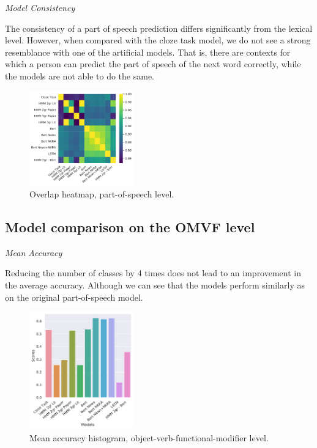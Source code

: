 \documentclass[a4paper]{article}
\newcommand{\head}[1]{\vspace{0.5em}\emph{#1}\vspace{0.25em}}
\begin{document}
\head{Model Consistency}

The consistency of a part of speech prediction differs significantly from the lexical level. However, when compared with the cloze task model, we do not see a strong resemblance with one of the artificial models. That is, there are contexts for which a person can predict the part of speech of the next word correctly, while the models are not able to do the same.

\begin{figure}
\label{fig:heatmap-context-accord-pos}
\caption{Overlap heatmap, part-of-speech level.}
\centering
\includegraphics[width=0.4\textwidth]{figures/pdf/heatmap-context-accord-pos.pdf}
\end{figure}


\subsection{Model comparison on the OMVF level}

\head{Mean Accuracy}

Reducing the number of classes by 4 times does not lead to an improvement in the average accuracy. Although we can see that the models perform similarly as on the original part-of-speech model.

\begin{figure}
\caption{Mean accuracy histogram, object-verb-functional-modifier level.}
\label{fig:mean-accuracy-hist-ovfm}
\centering
\includegraphics[width=0.4\textwidth]{figures/pdf/mean-accuracy-hist-ovfm.pdf}
\end{figure}
\end{document}
